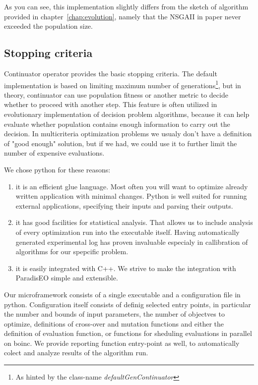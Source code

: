 \documentclass[12pt,oneside]{fithesis2}
\begin{document}
As you can see, this implementation slightly differs from the sketch of algorithm provided in chapter~\ref{chap:evolution}, namely that the NSGAII in paper never exceeded the population size.

\subsection{Stopping criteria}
Continuator operator provides the basic stopping criteria. The default implementation is based on limiting maximum number of generations\footnote{As hinted by the class-name \emph{defaultGenContinuator}}, but in theory, continuator can use population fitness or another metric to decide whether to proceed with another step. This feature is often utilized in evolutionary implementation of decision problem algorithms, because it can help evaluate whether population contains enough information to carry out the decision. In multicriteria optimization problems we usualy don't have a definition of "good enough" solution, but if we had, we could use it to further limit the number of expensive evaluations.

We chose python for these reasons:
\begin{enumerate}
\item it is an efficient glue language. 
Most often you will want to optimize already written application with minimal changes. Python is well suited for running external applications, specifying their inputs and parsing their outputs.
 
\item it has good facilities for statistical analysis.
That allows us to include analysis of every optimization run into the executable itself. Having automatically generated experimental log has proven invaluable especialy in callibration of algorithms for our spepcific problem.

\item it is easily integrated with C++.
We strive to make the integration with ParadisEO simple and extensible. 
\end{enumerate}

Our microframework consists of a single executable and a configuration file in python. Configuration itself consists of definig selected entry points, in particular the number and bounds of input parameters, the number of objectves to optimize, definitions of cross-over and mutation functions and either the definition of evaluation function, or functions for sheduling evaluations in parallel on boinc. We provide reporting function entry-point as well, to automatically colect and analyze results of the algorithm run.
\end{document}
